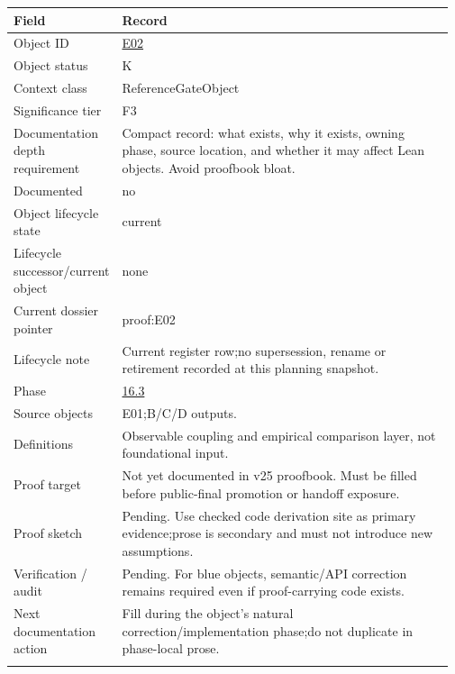 \begin{longtable}{L{0.16\linewidth} L{0.81\linewidth}}
\hline
\textbf{Field} & \textbf{Record}\\
\hline
Object ID & \hyperlink{object-row-E02}{E02}\\
\hline\addlinespace[0.20em]
Object status & K\\
\hline\addlinespace[0.20em]
Context class & ReferenceGateObject\\
\hline\addlinespace[0.20em]
Significance tier & F3\\
\hline\addlinespace[0.20em]
Documentation depth requirement & Compact record: what exists, why it exists, owning phase, source location, and whether it may affect Lean objects. Avoid proofbook bloat.\\
\hline\addlinespace[0.20em]
Documented & no\\
\hline\addlinespace[0.20em]
Object lifecycle state & current\\
\hline\addlinespace[0.20em]
Lifecycle successor/\allowbreak{}current object & none\\
\hline\addlinespace[0.20em]
Current dossier pointer & proof:E02\\
\hline\addlinespace[0.20em]
Lifecycle note & Current register row;\newline no supersession, rename or retirement recorded at this planning snapshot.\\
\hline\addlinespace[0.20em]
Phase & \hyperlink{phase-row-16-3}{16.3}\\
\hline\addlinespace[0.20em]
Source objects & E01;\newline B/\allowbreak{}C/\allowbreak{}D outputs.\\
\hline\addlinespace[0.20em]
Definitions & Observable coupling and empirical comparison layer, not foundational input.\\
\hline\addlinespace[0.20em]
Proof target & Not yet documented in v25 proofbook. Must be filled before public-final promotion or handoff exposure.\\
\hline\addlinespace[0.20em]
Proof sketch & Pending. Use checked code derivation site as primary evidence;\newline prose is secondary and must not introduce new assumptions.\\
\hline\addlinespace[0.20em]
Verification /\allowbreak{} audit & Pending. For blue objects, semantic/\allowbreak{}API correction remains required even if proof-carrying code exists.\\
\hline\addlinespace[0.20em]
Next documentation action & Fill during the object's natural correction/\allowbreak{}implementation phase;\newline do not duplicate in phase-local prose.\\
\hline\addlinespace[0.20em]
\end{longtable}
